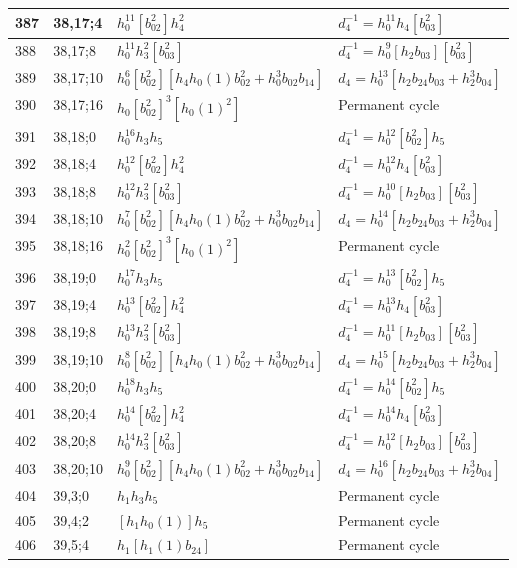 \documentclass{article}
\begin{document}
\begin{longtable}{|l|l|>{\raggedright\arraybackslash}p{6cm}|>{\raggedright\arraybackslash}p{6cm}|}
\hline
387 & 38,17;4 & $h_0^{11}[b_{02}^2]h_4^2$ & $d_{4}^{-1}=h_0^{11}h_4[b_{03}^2]$\\
\hline
388 & 38,17;8 & $h_0^{11}h_3^2[b_{03}^2]$ & $d_{4}^{-1}=h_0^9[h_2b_{03}][b_{03}^2]$\\
\hline
389 & 38,17;10 & $h_0^6[b_{02}^2][h_4h_0(1)b_{02}^2 + h_0^3b_{02}b_{14}]$ &$d_{4}=h_0^{13}[h_2b_{24}b_{03} + h_2^3b_{04}]$\\
\hline
390 & 38,17;16 & $h_0[b_{02}^2]^3[h_0(1)^2]$ & Permanent cycle\\
\hline
391 & 38,18;0 & $h_0^{16}h_3h_5$ & $d_{4}^{-1}=h_0^{12}[b_{02}^2]h_5$\\
\hline
392 & 38,18;4 & $h_0^{12}[b_{02}^2]h_4^2$ & $d_{4}^{-1}=h_0^{12}h_4[b_{03}^2]$\\
\hline
393 & 38,18;8 & $h_0^{12}h_3^2[b_{03}^2]$ & $d_{4}^{-1}=h_0^{10}[h_2b_{03}][b_{03}^2]$\\
\hline
394 & 38,18;10 & $h_0^7[b_{02}^2][h_4h_0(1)b_{02}^2 + h_0^3b_{02}b_{14}]$ &$d_{4}=h_0^{14}[h_2b_{24}b_{03} + h_2^3b_{04}]$\\
\hline
395 & 38,18;16 & $h_0^2[b_{02}^2]^3[h_0(1)^2]$ & Permanent cycle\\
\hline
396 & 38,19;0 & $h_0^{17}h_3h_5$ & $d_{4}^{-1}=h_0^{13}[b_{02}^2]h_5$\\
\hline
397 & 38,19;4 & $h_0^{13}[b_{02}^2]h_4^2$ & $d_{4}^{-1}=h_0^{13}h_4[b_{03}^2]$\\
\hline
398 & 38,19;8 & $h_0^{13}h_3^2[b_{03}^2]$ & $d_{4}^{-1}=h_0^{11}[h_2b_{03}][b_{03}^2]$\\
\hline
399 & 38,19;10 & $h_0^8[b_{02}^2][h_4h_0(1)b_{02}^2 + h_0^3b_{02}b_{14}]$ &$d_{4}=h_0^{15}[h_2b_{24}b_{03} + h_2^3b_{04}]$\\
\hline
400 & 38,20;0 & $h_0^{18}h_3h_5$ & $d_{4}^{-1}=h_0^{14}[b_{02}^2]h_5$\\
\hline
401 & 38,20;4 & $h_0^{14}[b_{02}^2]h_4^2$ & $d_{4}^{-1}=h_0^{14}h_4[b_{03}^2]$\\
\hline
402 & 38,20;8 & $h_0^{14}h_3^2[b_{03}^2]$ & $d_{4}^{-1}=h_0^{12}[h_2b_{03}][b_{03}^2]$\\
\hline
403 & 38,20;10 & $h_0^9[b_{02}^2][h_4h_0(1)b_{02}^2 + h_0^3b_{02}b_{14}]$ &$d_{4}=h_0^{16}[h_2b_{24}b_{03} + h_2^3b_{04}]$\\
\hline
404 & 39,3;0 & $h_1h_3h_5$ & Permanent cycle\\
\hline
405 & 39,4;2 & $[h_1h_0(1)]h_5$ & Permanent cycle\\
\hline
406 & 39,5;4 & $h_1[h_1(1)b_{24}]$ & Permanent cycle\\

\end{longtable}
\end{document}
